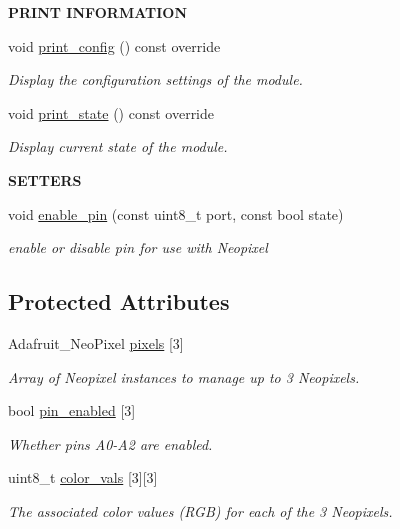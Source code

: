 \begin{Indent}{\bf P\+R\+I\+NT I\+N\+F\+O\+R\+M\+A\+T\+I\+ON}\par
\begin{DoxyCompactItemize}
\item 
void \hyperlink{class_loom___neopixel_aa1930cfa494ef432bbbf1d1786c6b57d}{print\+\_\+config} () const override
\begin{DoxyCompactList}\small\item\em Display the configuration settings of the module. \end{DoxyCompactList}\item 
void \hyperlink{class_loom___neopixel_a0a5e8fd23e4f32b006a52c422551b48e}{print\+\_\+state} () const override
\begin{DoxyCompactList}\small\item\em Display current state of the module. \end{DoxyCompactList}\end{DoxyCompactItemize}
\end{Indent}
\begin{Indent}{\bf S\+E\+T\+T\+E\+RS}\par
\begin{DoxyCompactItemize}
\item 
void \hyperlink{class_loom___neopixel_ac967b6eff14a0e028ff70524f70acd0c}{enable\+\_\+pin} (const uint8\+\_\+t port, const bool state)
\begin{DoxyCompactList}\small\item\em enable or disable pin for use with Neopixel \end{DoxyCompactList}\end{DoxyCompactItemize}
\end{Indent}
\subsection*{Protected Attributes}
\begin{DoxyCompactItemize}
\item 
Adafruit\+\_\+\+Neo\+Pixel \hyperlink{class_loom___neopixel_a3f177f651d50d29a0ca12d2a9ba5eb79}{pixels} \mbox{[}3\mbox{]}
\begin{DoxyCompactList}\small\item\em Array of Neopixel instances to manage up to 3 Neopixels. \end{DoxyCompactList}\item 
bool \hyperlink{class_loom___neopixel_aec3c3270cf9a4c9f942296a7ebd5147d}{pin\+\_\+enabled} \mbox{[}3\mbox{]}
\begin{DoxyCompactList}\small\item\em Whether pins A0-\/\+A2 are enabled. \end{DoxyCompactList}\item 
uint8\+\_\+t \hyperlink{class_loom___neopixel_ac084d5a5236d29d024c166a79e9423f1}{color\+\_\+vals} \mbox{[}3\mbox{]}\mbox{[}3\mbox{]}
\begin{DoxyCompactList}\small\item\em The associated color values (R\+GB) for each of the 3 Neopixels. \end{DoxyCompactList}\end{DoxyCompactItemize}
